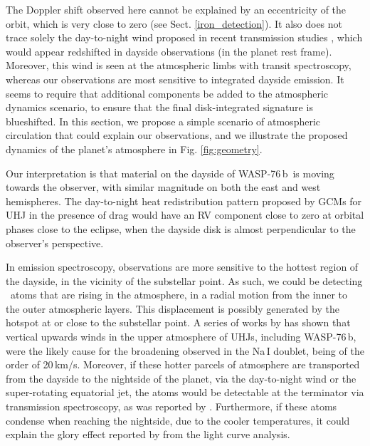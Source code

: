 \documentclass{aa}
\newcommand{\feI}{\ion{Fe}{i}}
\newcommand{\planet}{WASP-76\,b}
\begin{document}

The Doppler shift observed here cannot be explained by an eccentricity of the orbit, which is very close to zero (see Sect. \ref{iron_detection}). It also does not trace solely the day-to-night wind proposed in recent transmission studies \citep{seidel2019, seidel2021, ehrenreich2020}, which would appear redshifted in dayside observations (in the planet rest frame). Moreover, this wind is seen at the atmospheric limbs with transit spectroscopy, whereas our observations are most sensitive to integrated dayside emission. It seems to require that additional components be added to the atmospheric dynamics scenario, to ensure that the final disk-integrated signature is blueshifted. In this section, we propose a simple scenario of atmospheric circulation that could explain our observations, and we illustrate the proposed dynamics of the planet's atmosphere in Fig. \ref{fig:geometry}.

Our interpretation is that material on the dayside of \planet\ is moving towards the observer, with similar magnitude on both the east and west hemispheres. The day-to-night heat redistribution pattern proposed by GCMs for UHJ in the presence of drag \citep[e.g.][]{wardenier2021} would have an RV component close to zero at orbital phases close to the eclipse, when the dayside disk is almost perpendicular to the observer's perspective. 

In emission spectroscopy, observations are more sensitive to the hottest region of the dayside, in the vicinity of the substellar point. As such, we could be detecting \feI\ atoms that are rising in the atmosphere, in a radial motion from the inner to the outer atmospheric layers. This displacement is possibly generated by the hotspot at or close to the substellar point. A series of works by \citet{seidel2019, seidel2020, seidel2021} has shown that vertical upwards winds in the upper atmosphere of UHJs, including \planet, were the likely cause for the broadening observed in the Na\,I doublet, being of the order of 20\,km/s. Moreover, if these hotter parcels of atmosphere are transported from the dayside to the nightside of the planet, via the day-to-night wind or the super-rotating equatorial jet, the atoms would be detectable at the terminator via transmission spectroscopy, as was reported by \citet{ehrenreich2020, kesseli2021, kesseli2022, pelletier2023}. Furthermore, if these atoms condense when reaching the nightside, due to the cooler temperatures, it could explain the glory effect reported by \cite{demangeon2024} from the light curve analysis.
\end{document}
